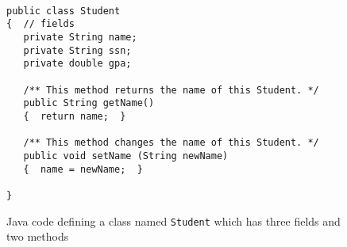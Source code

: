 





\begin {figure}


\begin{verbatim}

public class Student
{  // fields 
   private String name;
   private String ssn;
   private double gpa;

   /** This method returns the name of this Student. */
   public String getName()
   {  return name;  }

   /** This method changes the name of this Student. */
   public void setName (String newName)
   {  name = newName;  }

}
\end{verbatim}

\caption {Java code defining a class named
\texttt {Student} which has three fields and
two methods }
\label {fig:classWithMethods}

\end {figure}


